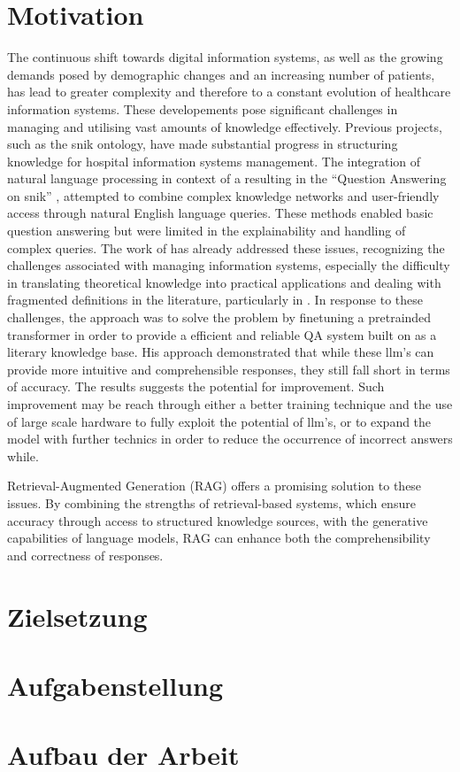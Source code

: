 \section{Motivation}
The continuous shift towards digital information systems, as well as the growing demands posed by demographic changes and an increasing number of patients, has lead to greater complexity and therefore to a constant evolution of healthcare information systems. 
These developements pose significant challenges in managing and utilising vast amounts of knowledge effectively. Previous projects, such as the \ac{snik} ontology, have made substantial progress in structuring knowledge for hospital information systems management. 
The integration of natural language processing in context of a  resulting in the \enquote{Question Answering on \ac{snik}} \citep{hannesbell, hannesbell_skill}, attempted to combine complex knowledge networks and user-friendly access through natural English language queries. 
These methods enabled basic question answering but were limited in the explainability and handling of complex queries.
The work of \citet{Paul_Keller} has already addressed these issues, recognizing the challenges associated with managing information systems, especially the difficulty in translating theoretical knowledge into practical applications and dealing with fragmented definitions in the literature, particularly in \citet{bb2}. 
In response to these challenges, the approach was to solve the problem by finetuning a pretrainded transformer in order to provide a efficient and reliable QA system built on \citet{bb2} as a literary knowledge base.
His approach demonstrated that while these \ac{llm}'s can provide more intuitive and comprehensible responses, they still fall short in terms of accuracy. 
The results suggests the potential for improvement. 
Such improvement may be reach through either a better training technique and the use of large scale hardware to fully exploit the potential of \ac{llm}'s, or to expand the model with further technics in order to reduce the occurrence of incorrect answers while.

Retrieval-Augmented Generation (RAG) offers a promising solution to these issues. 
By combining the strengths of retrieval-based systems, which ensure accuracy through access to structured knowledge sources, with the generative capabilities of language models, RAG can enhance both the comprehensibility and correctness of responses. 

\section{Zielsetzung}\label{sec:zielsetzung}


\section{Aufgabenstellung}



\section{Aufbau der Arbeit}
